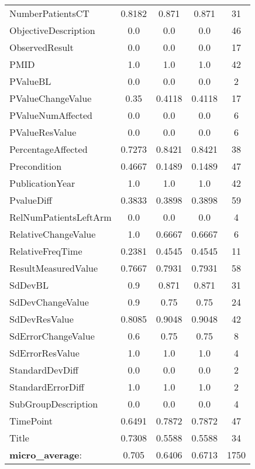 \begin{longtable}{ l c c c c}
NumberPatientsCT & 0.8182 & 0.871 & 0.871 & 31\\
ObjectiveDescription & 0.0 & 0.0 & 0.0 & 46\\
ObservedResult & 0.0 & 0.0 & 0.0 & 17\\
PMID & 1.0 & 1.0 & 1.0 & 42\\
PValueBL & 0.0 & 0.0 & 0.0 & 2\\
PValueChangeValue & 0.35 & 0.4118 & 0.4118 & 17\\
PValueNumAffected & 0.0 & 0.0 & 0.0 & 6\\
PValueResValue & 0.0 & 0.0 & 0.0 & 6\\
PercentageAffected & 0.7273 & 0.8421 & 0.8421 & 38\\
Precondition & 0.4667 & 0.1489 & 0.1489 & 47\\
PublicationYear & 1.0 & 1.0 & 1.0 & 42\\
PvalueDiff & 0.3833 & 0.3898 & 0.3898 & 59\\
RelNumPatientsLeftArm & 0.0 & 0.0 & 0.0 & 4\\
RelativeChangeValue & 1.0 & 0.6667 & 0.6667 & 6\\
RelativeFreqTime & 0.2381 & 0.4545 & 0.4545 & 11\\
ResultMeasuredValue & 0.7667 & 0.7931 & 0.7931 & 58\\
SdDevBL & 0.9 & 0.871 & 0.871 & 31\\
SdDevChangeValue & 0.9 & 0.75 & 0.75 & 24\\
SdDevResValue & 0.8085 & 0.9048 & 0.9048 & 42\\
SdErrorChangeValue & 0.6 & 0.75 & 0.75 & 8\\
SdErrorResValue & 1.0 & 1.0 & 1.0 & 4\\
StandardDevDiff & 0.0 & 0.0 & 0.0 & 2\\
StandardErrorDiff & 1.0 & 1.0 & 1.0 & 2\\
SubGroupDescription & 0.0 & 0.0 & 0.0 & 4\\
TimePoint & 0.6491 & 0.7872 & 0.7872 & 47\\
Title & 0.7308 & 0.5588 & 0.5588 & 34\\
\textbf{micro\_average}: & 0.705 & 0.6406 & 0.6713 & 1750 
\label{tab:Glaucoma_eventextr}
\end{longtable}
